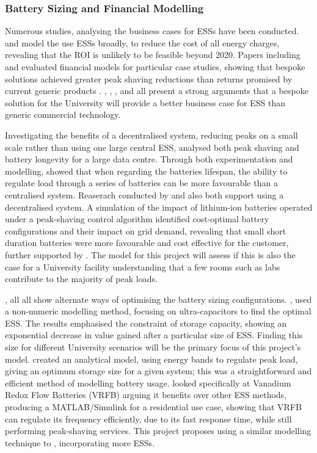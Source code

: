 \subsubsection{Battery Sizing and Financial
Modelling}\label{battery-sizing-and-financial-modelling}

Numerous studies, analysing the business cases for ESSs have been
conducted. \cite{7555795} and \cite{7555793} model the use ESSs broadly,
to reduce the cost of all energy charges, revealing that the ROI is
unlikely to be feasible beyond 2020. Papers including \cite{1300158} and
\cite{6175723} evaluated financial models for particular case studies,
showing that bespoke solutions achieved greater peak shaving reductions
than returns promised by current generic products \cite{abbpeakshave}.
\cite{7555795}, \cite{7555793}, \cite{1300158}, \cite{6175723} and
\cite{20164002874437} all present a strong arguments that a bespoke
solution for the University will provide a better business case for ESS
than generic commercial technology.

Investigating the benefits of a decentralised system, reducing peaks on
a small scale rather than using one large central ESS, \cite{6604477}
analysed both peak shaving and battery longevity for a large data
centre. Through both experimentation and modelling, \cite{6604477}
showed that when regarding the batteries lifespan, the ability to
regulate load through a series of batteries can be more favourable than
a centralised system. Reaserach conducted by \cite{6348200} and
\cite{Demonstr51:online} also both support using a decentralised system.
A simulation of the impact of lithium-ion batteries operated under a
peak-shaving control algorithm identified cost-optimal battery
configurations and their impact on grid demand, revealing that small
short duration batteries were more favourable and cost effective for the
customer, further supported by \cite{20164002874437}. The model for this
project will assess if this is also the case for a University facility
understanding that a few rooms such as labs contribute to the majority
of peak loads.

\cite{20160601898032}, \cite{Levron201280} all \cite{5371839} all show
alternate ways of optimising the battery sizing configurations.
\cite{5371839}, used a non-numeric modelling method, focusing on
ultra-capacitors to find the optimal ESS. The results emphasised the
constraint of storage capacity, showing an exponential decrease in value
gained after a particular size of ESS. Finding this size for different
University scenarios will be the primary focus of this project's model.
\cite{Levron201280} created an analytical model, using energy bands to
regulate peak load, giving an optimum storage size for a given system;
this was a straightforward and efficient method of modelling battery
usage. \cite{20160601898032} looked specifically at Vanadium Redox Flow
Batteries (VRFB) arguing it benefits over other ESS methods, producing a
MATLAB/Simulink for a residential use case, showing that VRFB can
regulate its frequency efficiently, due to its fast response time, while
still performing peak-shaving services. This project proposes using a
similar modelling technique to \cite{20160601898032}, incorporating more
ESSs.

